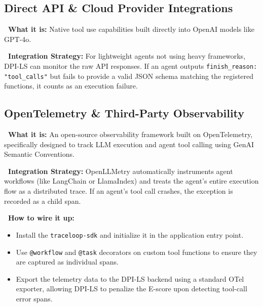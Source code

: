 \documentclass[11pt,a4paper]{article}
\begin{document}
\vspace{0.3cm}

\subsection{Direct API \& Cloud Provider Integrations}

\begin{tcolorbox}[enhanced, colback=gray!5!white, colframe=gray, title={\textbf{\faRobot\ OpenAI Function Calling API}}, fonttitle=\bfseries, boxrule=1pt, arc=2mm]
\textbf{\color{dpiblue}\faQuestionCircle\ What it is:} Native tool use capabilities built directly into OpenAI models like GPT-4o.

\vspace{0.2cm}
\textbf{\color{dpigreen}\faCogs\ Integration Strategy:} For lightweight agents not using heavy frameworks, DPI-LS can monitor the raw API responses. If an agent outputs \texttt{finish\_reason: "tool\_calls"} but fails to provide a valid JSON schema matching the registered functions, it counts as an execution failure.
\end{tcolorbox}

\vspace{0.3cm}

\subsection{OpenTelemetry \& Third-Party Observability}

\begin{tcolorbox}[enhanced, colback=gray!5!white, colframe=gray, title={\textbf{\faChartLine\ OpenLLMetry (by Traceloop)}}, fonttitle=\bfseries, boxrule=1pt, arc=2mm]
\textbf{\color{dpiblue}\faQuestionCircle\ What it is:} An open-source observability framework built on OpenTelemetry, specifically designed to track LLM execution and agent tool calling using GenAI Semantic Conventions.

\vspace{0.2cm}
\textbf{\color{dpigreen}\faCogs\ Integration Strategy:} OpenLLMetry automatically instruments agent workflows (like LangChain or LlamaIndex) and treats the agent's entire execution flow as a distributed trace. If an agent's tool call crashes, the exception is recorded as a child span.

\vspace{0.2cm}
\textbf{\color{dpicloud}\faPlug\ How to wire it up:}
\begin{itemize}
    \item \textbf{\color{gray}\faTerminal} Install the \texttt{traceloop-sdk} and initialize it in the application entry point.
    \item \textbf{\color{gray}\faCodeBranch} Use \texttt{@workflow} and \texttt{@task} decorators on custom tool functions to ensure they are captured as individual spans.
    \item \textbf{\color{gray}\faUpload} Export the telemetry data to the DPI-LS backend using a standard OTel exporter, allowing DPI-LS to penalize the E-score upon detecting tool-call error spans.
\end{itemize}
\end{tcolorbox}
\end{document}
